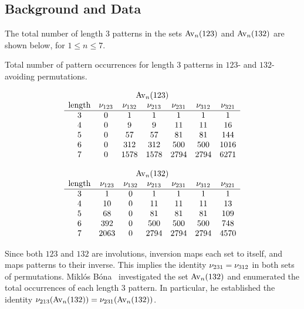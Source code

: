   \subsection{Background and Data}
    
    The total number of length $3$ patterns in the sets $\operatorname{{Av}}_n(123)$ and
    $\operatorname{{Av}}_n(132)$ are shown below, for $1 \leq n \leq 7$.  

    \begin{table}[t] \label{expat:tab:data}
    \caption[Total number of pattern occurrences]{Total number of pattern
        occurrences for length $3$ patterns in $123$- and $132$-avoiding
        permutations.}
    $$
    \begin{array}{ccccccc}
        \multicolumn{7}{c}{\Av_n(123) } \\
        \text{length} & \num_{123} & \num_{132} & \num_{213}
        & \num_{231} & \num_{312} & \num_{321} \\
        \hline
        3  & 0     &    1  &    1 &    1 &    1 &    1  \\
        4  & 0     &    9  &    9 &   11 &   11 &   16  \\
        5  & 0     &    57 &   57 &   81 &   81 &  144  \\
        6  & 0     &   312 &  312 &  500 &  500 & 1016  \\
        7  & 0     &  1578 & 1578 & 2794 & 2794 & 6271
      \end{array}
    $$

    \vspace{1pc}

    $$
    \begin{array}{ccccccc}
        \multicolumn{7}{c}{\Av_n(132) } \\
        \text{length} & \num_{123} & \num_{132} & \num_{213}
        & \num_{231} & \num_{312} & \num_{321} \\
        \hline
       3  & 1     &    0  &    1 &    1 &    1 &    1  \\
       4  & 10    &    0  &   11 &   11 &   11 &   13  \\
       5  & 68    &    0  &   81 &   81 &   81 &  109  \\
       6  & 392   &    0  &  500 &  500 &  500 &  748  \\
       7  & 2063  &    0  & 2794 & 2794 & 2794 & 4570
     \end{array}
    $$
    \end{table}

    Since both $123$ and $132$ are involutions,  inversion
    maps each set to itself, and maps patterns to their inverse. This implies
    the identity $\nu_{231} = \nu_{312}$ in both sets of permutations.  
    Mikl\'os B\'ona~\cite{Bona2010, Bona2012} investigated the set
    $\operatorname{{Av}}_n(132)$ and enumerated the total occurrences of each length 3 pattern.
    In particular, he established the identity $\nu_{213}(\operatorname{{Av}}_n(132))
    = \nu_{231}(\operatorname{{Av}}_n(132))$. 

